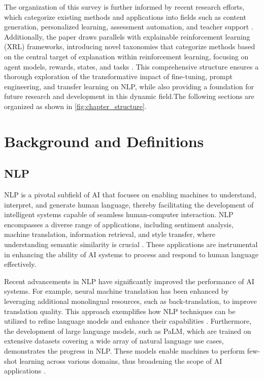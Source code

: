 The organization of this survey is further informed by recent research efforts, which categorize existing methods and applications into fields such as content generation, personalized learning, assessment automation, and teacher support \cite{kasneci2023chatgpt}. Additionally, the paper draws parallels with explainable reinforcement learning (XRL) frameworks, introducing novel taxonomies that categorize methods based on the central target of explanation within reinforcement learning, focusing on agent models, rewards, states, and tasks \cite{qing2023surveyexplainablereinforcementlearning}. This comprehensive structure ensures a thorough exploration of the transformative impact of fine-tuning, prompt engineering, and transfer learning on NLP, while also providing a foundation for future research and development in this dynamic field.The following sections are organized as shown in \autoref{fig:chapter_structure}.









\section{Background and Definitions} \label{sec:Background and Definitions}



\subsection{NLP} \label{subsec:NLP}



NLP is a pivotal subfield of AI that focuses on enabling machines to understand, interpret, and generate human language, thereby facilitating the development of intelligent systems capable of seamless human-computer interaction. NLP encompasses a diverse range of applications, including sentiment analysis, machine translation, information retrieval, and style transfer, where understanding semantic similarity is crucial \cite{yamshchikov2020styletransferparaphraselookingsensible}. These applications are instrumental in enhancing the ability of AI systems to process and respond to human language effectively.



Recent advancements in NLP have significantly improved the performance of AI systems. For example, neural machine translation has been enhanced by leveraging additional monolingual resources, such as back-translation, to improve translation quality. This approach exemplifies how NLP techniques can be utilized to refine language models and enhance their capabilities \cite{bogoychev2020domaintranslationesenoisesynthetic}. Furthermore, the development of large language models, such as PaLM, which are trained on extensive datasets covering a wide array of natural language use cases, demonstrates the progress in NLP. These models enable machines to perform few-shot learning across various domains, thus broadening the scope of AI applications \cite{chowdhery2023palm}.



